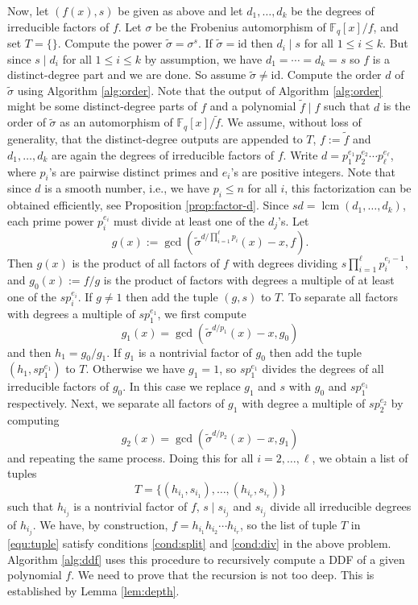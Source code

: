\documentclass[11pt]{article}
\theoremstyle{plain}
\theoremstyle{definition}
\DeclareMathOperator{\lcm}{lcm} %
\def\F{\ensuremath{\mathbb{F}}}
\begin{document}
Now, let $(f(x), s)$ be given as above and let $d_1, \dots, d_k$ be the degrees of irreducible 
factors of $f$. Let $\sigma$ be the Frobenius automorphism of $\F_q[x] / f$, and set $T = \{\}$. 
Compute the power $\tilde{\sigma} = \sigma^s$. If $\tilde{\sigma} = \text{id}$ then $d_i \mid s$ for 
all $1 \le i \le k$. But since $s \mid d_i$ for all $1 \le i \le k$ by assumption, we have $d_1 = 
\cdots = d_k = s$ so $f$ is a distinct-degree part and we are done. So assume $\tilde{\sigma} \ne 
\text{id}$. Compute the order $d$ of $\tilde{\sigma}$ using Algorithm \ref{alg:order}. Note that 
the output of Algorithm \ref{alg:order} might be some distinct-degree parts of $f$ and a polynomial 
$\tilde{f} \mid f$ such that $d$ is the order of $\tilde{\sigma}$ as an automorphism of $\F_q[x] / 
\tilde{f}$. We assume, without loss of generality, that the distinct-degree outputs are appended to 
$T$, $f := \tilde{f}$ and $d_1, \dots, d_k$ are again the degrees of irreducible factors of $f$.
Write $d = p_1^{e_1} p_2^{e_2} \cdots p_\ell^{e_\ell}$, where $p_i$'s are pairwise distinct primes 
and $e_i$'s are positive integers. Note that since $d$ is a smooth number, i.e., we have $p_i \le n$ 
for all $i$, this factorization can be obtained efficiently, see Proposition \ref{prop:factor-d}. 
Since $sd = \lcm(d_1, \dots, d_k)$, each prime power $p_i^{e_i}$ must divide at least one of the 
$d_j$'s. Let 
\[ g(x) := \gcd(\tilde{\sigma}^{d / \prod_{i = 1}^\ell p_i}(x) - x, f). \]
Then $g(x)$ is the product of all factors of $f$ with degrees dividing $s \prod_{i = 1}^\ell 
p_i^{e_i - 1}$, and $g_0(x) := f / g$ is the product of factors with degrees a multiple of at least 
one of the $sp_i^{e_i}$. If $g \ne 1$ then add the tuple $(g, s)$ to $T$. To separate all factors 
with degrees a multiple of $sp_1^{e_1}$, we first compute
\[ g_1(x) = \gcd(\tilde{\sigma}^{d / p_1}(x) - x, g_0) \]
and then $h_1 = g_0 / g_1$. If $g_1$ is a nontrivial factor of $g_0$ then add the tuple $(h_1, 
sp_1^{e_1})$ to $T$. Otherwise we have $g_1 = 1$, so $sp_1^{e_1}$ divides the degrees of all
irreducible factors of $g_0$. In this case we replace $g_1$ and $s$ with $g_0$ and $sp_1^{e_1}$ 
respectively. Next, we separate all factors of $g_1$ with degree a multiple of $sp_2^{e_2}$ by 
computing
\[ g_2(x) = \gcd(\tilde{\sigma}^{d / p_2}(x) - x, g_1) \]
and repeating the same process. Doing this for all $i = 2, \dots, \ell$, we obtain a list of tuples
\begin{equation}
	\label{equ:tuple}
	T = \{ (h_{i_1}, s_{i_1}), \dots, (h_{i_r}, s_{i_r}) \}
\end{equation}
such that $h_{i_j}$ is a nontrivial factor of $f$, $s \mid s_{i_j}$ and $s_{i_j}$ divide all 
irreducible degrees of $h_{i_j}$. We have, by construction, $f = h_{i_1}h_{i_2} \cdots h_{i_r}$, so 
the list of tuple $T$ in \eqref{equ:tuple} satisfy conditions \ref{cond:split} and \ref{cond:div} in 
the above problem. Algorithm \ref{alg:ddf} uses this procedure to recursively compute a DDF of a 
given polynomial $f$. We need to prove that the recursion is not too deep. This is established by 
Lemma \ref{lem:depth}.
\end{document}
